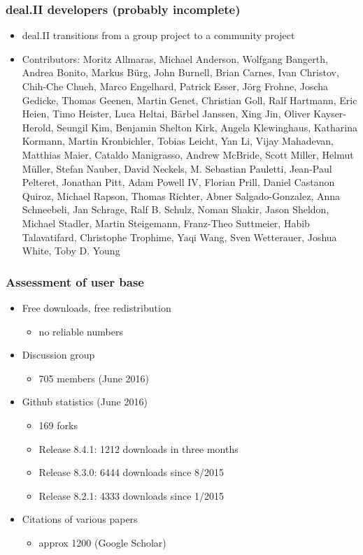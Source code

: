 \begin{frame}
  \frametitle{deal.II developers (probably incomplete)}
  \begin{itemize}
  \item deal.II transitions from a group project to a
    community project
  \item \footnotesize Contributors: Moritz Allmaras, Michael Anderson,
    Wolfgang Bangerth, Andrea Bonito, Markus Bürg, John Burnell, Brian
    Carnes, Ivan Christov, Chih-Che Chueh, Marco Engelhard, Patrick Esser, Jörg
    Frohne, Joscha Gedicke, Thomas Geenen, Martin Genet, Christian Goll, Ralf
    Hartmann, Eric Heien, Timo Heister, Luca Heltai, Bärbel Janssen,
    Xing Jin, Oliver Kayser-Herold, Seungil Kim, Benjamin Shelton
    Kirk, Angela Klewinghaus, Katharina Kormann, Martin Kronbichler,
    Tobias Leicht, Yan Li, Vijay Mahadevan, Matthias Maier, Cataldo
    Manigrasso, Andrew McBride, Scott Miller, Helmut Müller, Stefan
    Nauber, David Neckels, M. Sebastian Pauletti, Jean-Paul Pelteret,
    Jonathan Pitt, Adam Powell IV, Florian Prill, Daniel Castanon
    Quiroz, Michael Rapson, Thomas Richter, Abner Salgado-Gonzalez,
    Anna Schneebeli, Jan Schrage, Ralf B. Schulz, Noman Shakir, Jason Sheldon,
    Michael Stadler, Martin Steigemann, Franz-Theo Suttmeier, Habib
    Talavatifard, Christophe Trophime, Yaqi Wang, Sven Wetterauer,
    Joshua White, Toby D. Young
  \end{itemize}
\end{frame}

\begin{frame}
  \frametitle{Assessment of user base}
  \begin{itemize}
  \item Free downloads, free redistribution
    \begin{itemize}
    \item no reliable numbers
    \end{itemize}
  \item Discussion group
    \begin{itemize}
    \item 705 members (June 2016)
    \end{itemize}
  \item Github statistics (June 2016)
    \begin{itemize}
    \item 169 forks
    \item Release 8.4.1: 1212 downloads in three months
    \item Release 8.3.0: 6444 downloads since 8/2015
    \item Release 8.2.1: 4333 downloads since 1/2015
    \end{itemize}
  \item Citations of various papers
    \begin{itemize}
    \item approx 1200 (Google Scholar)
    \end{itemize}
  \end{itemize}
\end{frame}

